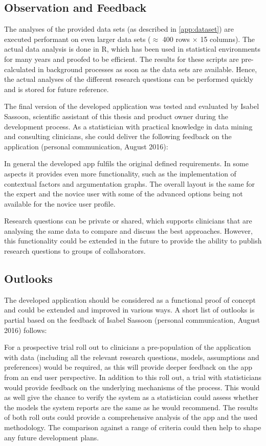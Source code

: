 \subsection{Observation and Feedback}
\sloppy

The analyses of the provided data sets (as described in \autoref{app:dataset}) are executed performant on even larger data sets ($\approx$ 400 rows $\times$ 15 columns). The actual data analysis is done in \gls{R}, which has been used in statistical environments for many years and proofed to be efficient. The results for these scripts are pre-calculated in background processes as soon as the data sets are available. Hence, the actual analyses of the different research questions can be performed quickly and is stored for future reference.

The final version of the developed application was tested and evaluated by Isabel Sassoon, scientific assistant of this thesis and product owner during the development process. As a statistician with practical knowledge in data mining and consulting clinicians, she could deliver the following feedback on the application (personal communication, August 2016):

In general the developed app fulfils the original defined requirements. In some aspects it provides even more functionality, such as the implementation of contextual factors and argumentation graphs. The overall layout is the same for the expert and the novice user with some of the advanced options being not available for the novice user profile.

Research questions can be private or shared, which supports clinicians that are analysing the same data to compare and discuss the best approaches. However, this functionality could be extended in the future to provide the ability to publish research questions to groups of collaborators.


\subsection{Outlooks}
\label{sub:outlooks}

The developed application should be considered as a functional proof of concept and could be extended and improved in various ways. A short list of outlooks is partial based on the feedback of Isabel Sassoon (personal communication, August 2016) follows:

For a prospective trial roll out to clinicians a pre-population of the application with data (including  all the relevant research questions, models, assumptions and preferences) would be required, as this will provide deeper feedback on the app from an end user perspective. In addition to this roll out, a trial with statisticians would provide feedback on the underlying mechanisms of the process. This would as well give the chance to verify the system as a statistician could assess whether the models the system reports are the same as he would recommend. The results of both roll outs could provide a comprehensive analysis of the app and the used methodology. The comparison against a range of criteria could then help to shape any future development plans.

